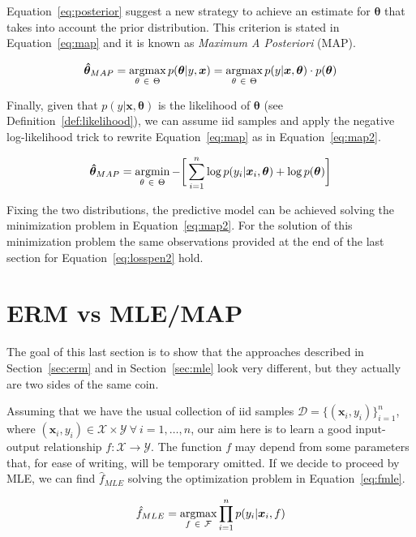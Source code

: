 Equation~\eqref{eq:posterior} suggest a new strategy to achieve an estimate for $\bm{\theta}$ that takes into account the prior distribution. This criterion is stated in Equation~\eqref{eq:map} and it is known as \textit{Maximum A Posteriori} (MAP).

\begin{equation} \label{eq:map}
	\bm{\hat \theta}_{MAP} = \mathop{\mathrm{argmax}}\limits_{\theta~\in~\Theta} p(\bm{\theta}|y,\bm{x}) = \mathop{\mathrm{argmax}}\limits_{\theta~\in~\Theta} p(y|\bm{x}, \bm{\theta}) \cdot p(\bm{\theta})
\end{equation}

Finally, given that $p(y|\bm{x}, \bm{\theta})$ is the likelihood of $\bm{\theta}$ (see Definition~\ref{def:likelihood}), we can assume \ac{iid} samples and apply the negative log-likelihood trick to rewrite Equation~\eqref{eq:map} as in Equation~\eqref{eq:map2}.

\begin{equation} \label{eq:map2}
	\bm{\hat \theta}_{MAP} = \mathop{\mathrm{argmin}}\limits_{\theta~\in~\Theta} - \bigg[\sum_{i=1}^n \log p(y_i|\bm{x}_i,\bm{\theta})  + \log p(\bm{\theta})\bigg]
\end{equation}

Fixing the two distributions, the predictive model can be achieved solving the minimization problem in Equation~\eqref{eq:map2}. For the solution of this minimization problem the same observations provided at the end of the last section for Equation~\eqref{eq:losspen2} hold.

\section{ERM vs MLE/MAP} \label{sec:erm-mlemap_connection}
The goal of this last section is to show that the approaches described in Section~\ref{sec:erm} and in Section~\ref{sec:mle} look very different, but they actually are two sides of the same coin.

Assuming that we have the usual collection of \ac{iid} samples $\mathcal{D}=\{(\bm{x}_i,y_i)\}_{i=1}^n$, where $(\bm{x}_i,y_i) \in \mathcal{X} \times \mathcal{Y}~\forall~i=1,\dots,n$, our aim here is to learn a good input-output relationship $f: \mathcal{X} \rightarrow \mathcal{Y}$. The function $f$ may depend from some parameters that, for ease of writing, will be temporary omitted. If we decide to proceed by MLE, we can find $\hat f_{MLE}$ solving the optimization problem in Equation~\eqref{eq:fmle}.

\begin{equation} \label{eq:fmle}
	\hat f_{MLE} = \mathop{\mathrm{argmax}}\limits_{f~\in~\mathcal{F}} \prod_{i=1}^n p(y_i|\bm{x}_i,f)
\end{equation}

